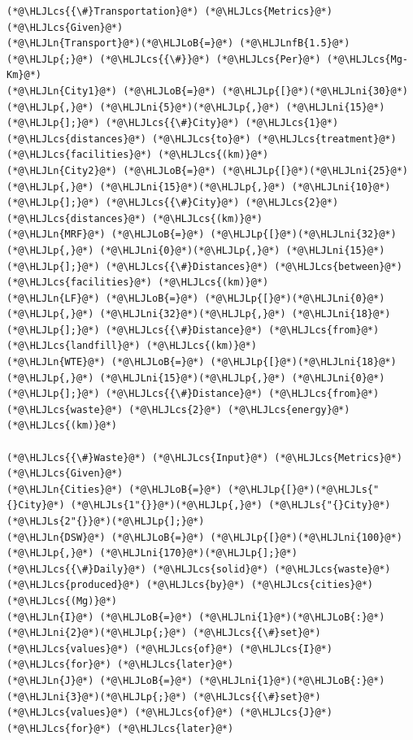 \documentclass[12pt,a4paper]{article}
\newcommand{\HLJLn}[1]{#1}
\newcommand{\HLJLs}[1]{\textcolor[RGB]{201,61,57}{#1}}
\newcommand{\HLJLnfB}[1]{\textcolor[RGB]{59,151,46}{#1}}
\newcommand{\HLJLni}[1]{\textcolor[RGB]{59,151,46}{#1}}
\newcommand{\HLJLoB}[1]{\textcolor[RGB]{102,102,102}{\textbf{#1}}}
\newcommand{\HLJLp}[1]{#1}
\newcommand{\HLJLcs}[1]{\textcolor[RGB]{153,153,119}{\textit{#1}}}
\begin{document}
\begin{lstlisting}
(*@\HLJLcs{{\#}Transportation}@*) (*@\HLJLcs{Metrics}@*) (*@\HLJLcs{Given}@*)
(*@\HLJLn{Transport}@*)(*@\HLJLoB{=}@*) (*@\HLJLnfB{1.5}@*)(*@\HLJLp{;}@*) (*@\HLJLcs{{\#}}@*) (*@\HLJLcs{Per}@*) (*@\HLJLcs{Mg-Km}@*)
(*@\HLJLn{City1}@*) (*@\HLJLoB{=}@*) (*@\HLJLp{[}@*)(*@\HLJLni{30}@*)(*@\HLJLp{,}@*) (*@\HLJLni{5}@*)(*@\HLJLp{,}@*) (*@\HLJLni{15}@*)(*@\HLJLp{];}@*) (*@\HLJLcs{{\#}City}@*) (*@\HLJLcs{1}@*) (*@\HLJLcs{distances}@*) (*@\HLJLcs{to}@*) (*@\HLJLcs{treatment}@*) (*@\HLJLcs{facilities}@*) (*@\HLJLcs{(km)}@*)
(*@\HLJLn{City2}@*) (*@\HLJLoB{=}@*) (*@\HLJLp{[}@*)(*@\HLJLni{25}@*)(*@\HLJLp{,}@*) (*@\HLJLni{15}@*)(*@\HLJLp{,}@*) (*@\HLJLni{10}@*)(*@\HLJLp{];}@*) (*@\HLJLcs{{\#}City}@*) (*@\HLJLcs{2}@*) (*@\HLJLcs{distances}@*) (*@\HLJLcs{(km)}@*)
(*@\HLJLn{MRF}@*) (*@\HLJLoB{=}@*) (*@\HLJLp{[}@*)(*@\HLJLni{32}@*)(*@\HLJLp{,}@*) (*@\HLJLni{0}@*)(*@\HLJLp{,}@*) (*@\HLJLni{15}@*)(*@\HLJLp{];}@*) (*@\HLJLcs{{\#}Distances}@*) (*@\HLJLcs{between}@*) (*@\HLJLcs{facilities}@*) (*@\HLJLcs{(km)}@*)
(*@\HLJLn{LF}@*) (*@\HLJLoB{=}@*) (*@\HLJLp{[}@*)(*@\HLJLni{0}@*)(*@\HLJLp{,}@*) (*@\HLJLni{32}@*)(*@\HLJLp{,}@*) (*@\HLJLni{18}@*)(*@\HLJLp{];}@*) (*@\HLJLcs{{\#}Distance}@*) (*@\HLJLcs{from}@*) (*@\HLJLcs{landfill}@*) (*@\HLJLcs{(km)}@*)
(*@\HLJLn{WTE}@*) (*@\HLJLoB{=}@*) (*@\HLJLp{[}@*)(*@\HLJLni{18}@*)(*@\HLJLp{,}@*) (*@\HLJLni{15}@*)(*@\HLJLp{,}@*) (*@\HLJLni{0}@*)(*@\HLJLp{];}@*) (*@\HLJLcs{{\#}Distance}@*) (*@\HLJLcs{from}@*) (*@\HLJLcs{waste}@*) (*@\HLJLcs{2}@*) (*@\HLJLcs{energy}@*) (*@\HLJLcs{(km)}@*)

(*@\HLJLcs{{\#}Waste}@*) (*@\HLJLcs{Input}@*) (*@\HLJLcs{Metrics}@*) (*@\HLJLcs{Given}@*)
(*@\HLJLn{Cities}@*) (*@\HLJLoB{=}@*) (*@\HLJLp{[}@*)(*@\HLJLs{"{}City}@*) (*@\HLJLs{1"{}}@*)(*@\HLJLp{,}@*) (*@\HLJLs{"{}City}@*) (*@\HLJLs{2"{}}@*)(*@\HLJLp{];}@*)
(*@\HLJLn{DSW}@*) (*@\HLJLoB{=}@*) (*@\HLJLp{[}@*)(*@\HLJLni{100}@*)(*@\HLJLp{,}@*) (*@\HLJLni{170}@*)(*@\HLJLp{];}@*) (*@\HLJLcs{{\#}Daily}@*) (*@\HLJLcs{solid}@*) (*@\HLJLcs{waste}@*) (*@\HLJLcs{produced}@*) (*@\HLJLcs{by}@*) (*@\HLJLcs{cities}@*) (*@\HLJLcs{(Mg)}@*)
(*@\HLJLn{I}@*) (*@\HLJLoB{=}@*) (*@\HLJLni{1}@*)(*@\HLJLoB{:}@*)(*@\HLJLni{2}@*)(*@\HLJLp{;}@*) (*@\HLJLcs{{\#}set}@*) (*@\HLJLcs{values}@*) (*@\HLJLcs{of}@*) (*@\HLJLcs{I}@*) (*@\HLJLcs{for}@*) (*@\HLJLcs{later}@*)
(*@\HLJLn{J}@*) (*@\HLJLoB{=}@*) (*@\HLJLni{1}@*)(*@\HLJLoB{:}@*)(*@\HLJLni{3}@*)(*@\HLJLp{;}@*) (*@\HLJLcs{{\#}set}@*) (*@\HLJLcs{values}@*) (*@\HLJLcs{of}@*) (*@\HLJLcs{J}@*) (*@\HLJLcs{for}@*) (*@\HLJLcs{later}@*)


\end{lstlisting}
\end{document}

